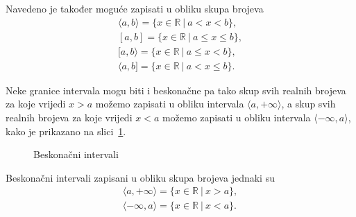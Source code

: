 Navedeno je također moguće zapisati u obliku skupa brojeva
\begin{gather*}
    \langle a,b \rangle = \{ x \in \mathbb{R} \ | \ a < x < b \},\\
    [ a,b ] = \{ x \in \mathbb{R} \ | \ a \leq x \leq b \},\\
    [ a,b \rangle = \{ x \in \mathbb{R} \ | \ a \leq x < b \},\\
    \langle a,b ] = \{ x \in \mathbb{R} \ | \ a < x \leq b \}.
\end{gather*}

Neke granice intervala mogu biti i beskonačne pa tako skup svih realnih brojeva za koje vrijedi $x>a$ možemo zapisati u obliku intervala $\langle a,+\infty \rangle$, a skup svih realnih brojeva za koje vrijedi $x<a$ možemo zapisati u obliku intervala $\langle -\infty , a \rangle$, kako je prikazano na slici~\ref{fig:beskonačni-intervali}.

\begin{figure}[ht]
\begin{center}\vspace{0.5cm}

\vspace{0.5cm}
\end{center}
\caption{Beskonačni intervali}\label{fig:beskonačni-intervali}
\end{figure}

Beskonačni intervali zapisani u obliku skupa brojeva jednaki su
\begin{gather*}
    \langle a, +\infty \rangle = \{ x \in \mathbb{R} \ | \ x > a \},\\
    \langle -\infty , a \rangle = \{ x \in \mathbb{R} \ | \ x < a \}.
\end{gather*}

